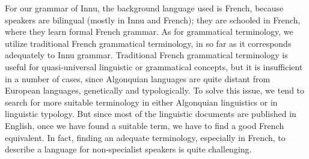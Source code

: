 For our grammar of Innu, the background language used is French, because speakers are bilingual (mostly in Innu and French); they are schooled in French, where they learn formal French grammar. As for grammatical terminology, we utilize traditional French grammatical terminology, in so far as it corresponds adequately to Innu grammar. Traditional French grammatical terminology is useful for quasi-universal linguistic or grammatical concepts, but it is insufficient in a number of cases, since Algonquian languages are quite distant from European languages, genetically and typologically. To solve this issue, we tend to search for more suitable terminology in either Algonquian linguistics or in linguistic typology. But since most of the linguistic documents are published in English, once we have found a suitable term, we have to find a good French equivalent. In fact, finding an adequate terminology, especially in French, to describe a language for non-specialist speakers is quite challenging.

